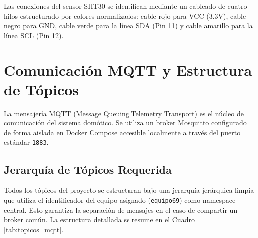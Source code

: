 \documentclass[12pt,letterpaper]{article}
\begin{document}
Las conexiones del sensor SHT30 se identifican mediante un cableado de cuatro hilos estructurado por colores normalizados: cable rojo para VCC (3.3V), cable negro para GND, cable verde para la línea SDA (Pin 11) y cable amarillo para la línea SCL (Pin 12).

\section{Comunicación MQTT y Estructura de Tópicos}
La mensajería MQTT (Message Queuing Telemetry Transport) es el núcleo de comunicación del sistema domótico. Se utiliza un broker Mosquitto configurado de forma aislada en Docker Compose accesible localmente a través del puerto estándar \texttt{1883}.

\subsection{Jerarquía de Tópicos Requerida}
Todos los tópicos del proyecto se estructuran bajo una jerarquía jerárquica limpia que utiliza el identificador del equipo asignado (\texttt{equipo69}) como namespace central. Esto garantiza la separación de mensajes en el caso de compartir un broker común. La estructura detallada se resume en el Cuadro \ref{tab:topicos_mqtt}.
\end{document}
